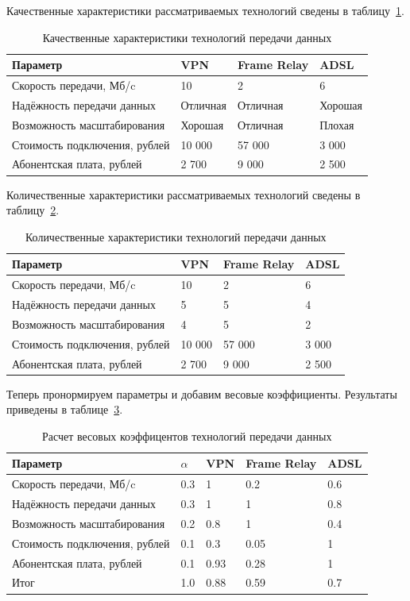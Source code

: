 \documentclass[russian,utf8,emptystyle]{eskdtext}
\begin{document}
Качественные характеристики рассматриваемых технологий сведены в таблицу~\ref{tab:connect-1}.

\begin{longtable}{p{7cm}|p{2cm}|p{2cm}|p{2cm}}
\caption{Качественные характеристики технологий передачи данных}
\label{tab:connect-1} \\
Параметр  & VPN & Frame Relay & ADSL \\ 
\hline 
Скорость передачи, Мб/c     & 10 & 2 & 6  \\ 
Надёжность передачи данных & Отличная & Отличная & Хорошая  \\ 
Возможность масштабирования & Хорошая & Отличная & Плохая  \\ 
Стоимость подключения, рублей & 10 000 & 57 000 & 3 000  \\ 
Абонентская плата, рублей & 2 700 & 9 000 & 2 500 \\
\end{longtable}

Количественные характеристики рассматриваемых технологий сведены в таблицу~\ref{tab:connect-2}.

\begin{longtable}{p{7cm}|p{2cm}|p{2cm}|p{2cm}}
\caption{Количественные характеристики технологий передачи данных}
\label{tab:connect-2} \\
Параметр  & VPN & Frame Relay & ADSL \\ 
\hline 
Скорость передачи, Мб/c     & 10 & 2 & 6  \\ 
Надёжность передачи данных & 5 & 5 & 4  \\ 
Возможность масштабирования & 4 & 5 & 2  \\ 
Стоимость подключения, рублей & 10 000 & 57 000 & 3 000  \\ 
Абонентская плата, рублей & 2 700 & 9 000 & 2 500 \\
\end{longtable}

Теперь пронормируем параметры и добавим весовые коэффициенты. Результаты приведены в таблице~\ref{tab:connect-3}.

\begin{longtable}{p{7cm}|p{1cm}|p{2cm}|p{2cm}|p{2cm}}
\caption{Расчет весовых коэффицентов технологий передачи данных}
\label{tab:connect-3} \\
Параметр & $\alpha$ & VPN & Frame Relay & ADSL \\ 
\hline 
Скорость передачи, Мб/c      & 0.3 & 1    & 0.2  & 0.6   \\ 
Надёжность передачи данных   & 0.3 & 1    & 1    & 0.8   \\ 
Возможность масштабирования  & 0.2 & 0.8  & 1    & 0.4   \\ 
Стоимость подключения, рублей& 0.1 & 0.3  & 0.05 & 1     \\ 
Абонентская плата, рублей    & 0.1 & 0.93 & 0.28 & 1     \\
\hline
Итог                         & 1.0 & 0.88 & 0.59 & 0.7
\end{longtable}
\end{document}
